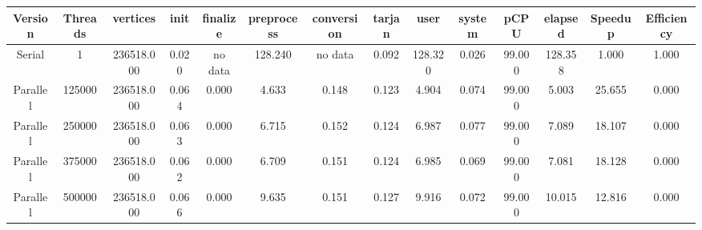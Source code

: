 \begin{tabular}{|c|c|c|c|c|c|c|c|c|c|c|c|c|c|}
\toprule
 Version &  Threads &   vertices &  init & finalize &  preprocess & conversion &  tarjan &    user &  system &   pCPU &  elapsed &  Speedup &  Efficiency \\
\midrule
  Serial &        1 & 236518.000 & 0.020 &  no data &     128.240 &    no data &   0.092 & 128.320 &   0.026 & 99.000 &  128.358 &    1.000 &       1.000 \\
Parallel &   125000 & 236518.000 & 0.064 &    0.000 &       4.633 &      0.148 &   0.123 &   4.904 &   0.074 & 99.000 &    5.003 &   25.655 &       0.000 \\
Parallel &   250000 & 236518.000 & 0.063 &    0.000 &       6.715 &      0.152 &   0.124 &   6.987 &   0.077 & 99.000 &    7.089 &   18.107 &       0.000 \\
Parallel &   375000 & 236518.000 & 0.062 &    0.000 &       6.709 &      0.151 &   0.124 &   6.985 &   0.069 & 99.000 &    7.081 &   18.128 &       0.000 \\
Parallel &   500000 & 236518.000 & 0.066 &    0.000 &       9.635 &      0.151 &   0.127 &   9.916 &   0.072 & 99.000 &   10.015 &   12.816 &       0.000 \\
\bottomrule
\end{tabular}
